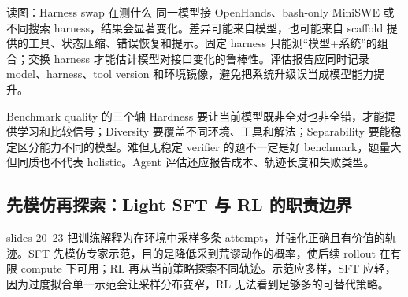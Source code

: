
\begin{knowledgebox}{读图：Harness swap 在测什么}
同一模型接 OpenHands、bash-only MiniSWE 或不同搜索 harness，结果会显著变化。差异可能来自模型，也可能来自 scaffold 提供的工具、状态压缩、错误恢复和提示。固定 harness 只能测“模型+系统”的组合；交换 harness 才能估计模型对接口变化的鲁棒性。评估报告应同时记录 model、harness、tool version 和环境镜像，避免把系统升级误当成模型能力提升。
\end{knowledgebox}

\begin{importantbox}{Benchmark quality 的三个轴}
Hardness 要让当前模型既非全对也非全错，才能提供学习和比较信号；Diversity 要覆盖不同环境、工具和解法；Separability 要能稳定区分能力不同的模型。难但无稳定 verifier 的题不一定是好 benchmark，题量大但同质也不代表 holistic。Agent 评估还应报告成本、轨迹长度和失败类型。
\end{importantbox}

\subsection{先模仿再探索：Light SFT 与 RL 的职责边界}

slides 20--23 把训练解释为在环境中采样多条 attempt，并强化正确且有价值的轨迹。SFT 先模仿专家示范，目的是降低采到荒谬动作的概率，使后续 rollout 在有限 compute 下可用；RL 再从当前策略探索不同轨迹。示范应多样，SFT 应轻，因为过度拟合单一示范会让采样分布变窄，RL 无法看到足够多的可替代策略。


